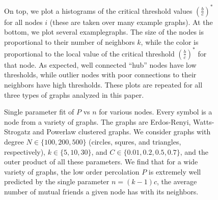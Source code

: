 \documentclass{article}
\renewcommand{\=}[1]{\stackrel{#1}{=}} %
\begin{document}
 


\begin{figure}
\noindent{}
\noindent{}
\caption{
On top, we plot a histograms of the critical threshold values $\left(\frac{b}{c}\right)^*$ for all nodes $i$ (these are taken over many example graphs). At the bottom, we plot several examplegraphs. The size of the nodes is proportional to their number of neighbors $k$, while the color is proportional to the local value of the critical threshold $\left(\frac{b}{c}\right)^*$ for that node. As expected, well connected ``hub'' nodes have low thresholds, while outlier nodes with poor connections to their neighbors have high thresholds. These plots are repeated for all three types of graphs analyzed in this paper.}

\label{fig:local_thresholds}
\end{figure}






\begin{figure}
\noindent{}
\noindent{}
\caption{
Single parameter fit of $P$ vs $n$ for various nodes. Every symbol is a node from a variety of graphs. The graphs are Erdos-Renyi, Watts-Strogatz and Powerlaw clustered graphs. We consider graphs with degree $N \in \{100,200,500\}$ (circles, squres, and triangles, respectively), $k \in \{5,10,30\}$, and $C \in \{0.01, 0.2, 0.5, 0.7\}$, and the outer product of all these parameters. We find that for a wide variety of graphs, the low order percolation $P$ is extremely well predicted by the single parameter $n = (k-1)c$, the average number of mutual friends a given node has with its neighbors.}

\label{fig:P_vs_n_fits}
\end{figure}
\end{document}
